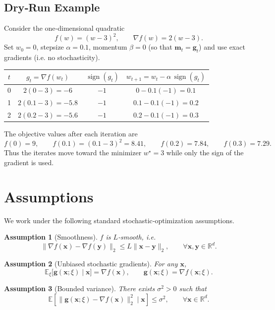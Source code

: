 \documentclass{article}
\newtheorem{assumption}{Assumption}
\newcommand{\sign}{\operatorname{sign}}
\newcommand{\E}{\mathbb{E}}
\newcommand{\R}{\mathbb{R}}
\begin{document}
\subsection*{Dry‑Run Example}
Consider the one‑dimensional quadratic
\[
f(w)=(w-3)^{2},\qquad \nabla f(w)=2(w-3).
\]
Set $w_{0}=0$, stepsize $\alpha=0.1$, momentum $\beta=0$ (so that $\bm{m}_{t}=\bm{g}_{t}$) and use exact gradients (i.e. no stochasticity).

\begin{center}
\begin{tabular}{c|c|c|c}
$t$ & $g_{t}= \nabla f(w_{t})$ & $\,\sign(g_{t})$ & $w_{t+1}=w_{t}-\alpha\,\sign(g_{t})$ \\ \hline
0 & $2(0-3)=-6$ & $-1$ & $0-0.1(-1)=0.1$ \\[2mm]
1 & $2(0.1-3)=-5.8$ & $-1$ & $0.1-0.1(-1)=0.2$ \\[2mm]
2 & $2(0.2-3)=-5.6$ & $-1$ & $0.2-0.1(-1)=0.3$
\end{tabular}
\end{center}
The objective values after each iteration are
\[
f(0)=9,\qquad f(0.1)= (0.1-3)^{2}=8.41,\qquad
f(0.2)=7.84,\qquad f(0.3)=7.29 .
\]
Thus the iterates move toward the minimizer $w^{\star}=3$ while only the sign of the gradient is used.

\section*{Assumptions}
We work under the following standard stochastic‑optimization assumptions.

\begin{assumption}[Smoothness]
\label{ass:smooth}
$f$ is $L$‑smooth, i.e.
\[
\|\nabla f(\bm{x})-\nabla f(\bm{y})\|_{2}\le L\|\bm{x}-\bm{y}\|_{2},
\qquad\forall\bm{x},\bm{y}\in\R^{d}.
\tag{A1}
\]
\end{assumption}

\begin{assumption}[Unbiased stochastic gradients]
\label{ass:unbiased}
For any $\bm{x}$,
\[
\E_{\xi}\big[\bm{g}(\bm{x};\xi)\mid \bm{x}\big]=\nabla f(\bm{x}),
\qquad\bm{g}(\bm{x};\xi)=\nabla f(\bm{x};\xi).
\tag{A2}
\]
\end{assumption}

\begin{assumption}[Bounded variance]
\label{ass:variance}
There exists $\sigma^{2}>0$ such that
\[
\E\!\left[\big\|\bm{g}(\bm{x};\xi)-\nabla f(\bm{x})\big\|_{2}^{2}\mid \bm{x}\right]\le\sigma^{2},
\qquad\forall\bm{x}\in\R^{d}.
\tag{A3}
\]
\end{assumption}
\end{document}
